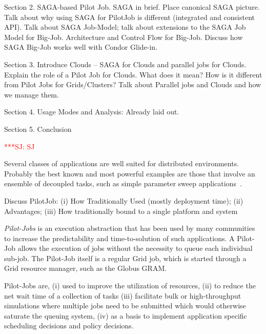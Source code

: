 \documentclass[conference,final]{IEEEtran}
\newcommand{\jhanote}[1]{ {\textcolor{red} { ***SJ: #1 }}}
\newcommand{\jhanote}[1]{}
\begin{document}
\bigskip

Section 2. SAGA-based Pilot Job.  SAGA in brief. Place canonical SAGA
picture. Talk about why using SAGA for PilotJob is different
(integrated and consistent API). Talk about SAGA Job-Model; talk about
extensions to the SAGA Job Model for Big-Job.  Architecture and Control
Flow for Big-Job. Discuss how SAGA Big-Job works well with Condor
Glide-in.

\bigskip 

Section 3. Introduce Clouds -- SAGA for Clouds and parallel jobs for
Clouds. Explain the role of a Pilot Job for Clouds. What does it mean?
How is it different from Pilot Jobs for Grids/Clusters?  Talk about
Parallel jobs and Clouds and how we manage them.

\bigskip 

Section 4. Usage Modes and Analysis: Already laid out.

\bigskip 
Section 5. Conclusion

 \jhanote{SJ}

Several classes of applications are well suited for distributed
environments. Probably the best known and most powerful examples are
those that involve an ensemble of decoupled tasks, such as simple
parameter sweep applications~\cite{1239909}.

Discuss PilotJob: (i) How Traditionally Used (mostly deployment time);
(ii) Advantages; (iii) How traditionally bound to a single platform
and system 

\emph{Pilot-Jobs} is an execution abstraction that has been used by
many communities to increase the predictability and time-to-solution
of such applications. A Pilot-Job allows the execution of jobs without
the necessity to queue each individual sub-job. The Pilot-Job itself
is a regular Grid job, which is started through a Grid resource
manager, such as the Globus GRAM.

Pilot-Jobs are, (i) used to improve the utilization of resources, (ii)
to reduce the net wait time of a collection of tasks (iii) facilitate
bulk or high-throughput simulations where multiple jobs need to be
submitted which would otherwise saturate the queuing system, (iv) as a
basis to implement application specific scheduling decisions and
policy decisions. 
\end{document}
